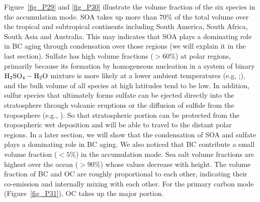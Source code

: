 \documentclass[12pt, fullpage]{uiucthesis2009}
\begin{document}
	Figure~\ref{fig_P29} and \ref{fig_P30} illustrate the volume fraction of the six species in the accumulation mode. SOA takes up more than $70\%$ of the total volume over the tropical and subtropical continents including South America, South Africa, South Asia and Australia. This may indicates that SOA plays a dominating role in BC aging through condensation over those regions (we will explain it in the last section). Sulfate has high volume fractions ($> 60\%$) at polar regions, primarily because its formation by homogeneous nucleation in a system of binary $\rm H_{2}SO_{4}-H_{2}O$ mixture is more likely at a lower ambient temperatures (e.g, \cite{hamill1977nchs};\cite{yue1982temperature}), and the bulk volume of all species at high latitudes tend to be low. In addition, sulfur species that ultimately forms sulfate can be ejected directly into the stratosphere through volcanic eruptions or the diffusion of sulfide from the troposphere (e.g., \cite{castleman1974isotopic}). So that stratospheric portion can be protected from the tropospheric wet deposition and will be able to travel to the distant polar regions. In a later section, we will show that the condensation of SOA and sulfate plays a dominating role in BC aging. We also noticed that BC contribute a small volume fraction ($< 5\%$) in the accumulation mode. Sea salt volume fractions are highest over the ocean ($> 90\%$) whose values decrease with height. The volume fraction of BC and OC are roughly proportional to each other, indicating their co-emission and internally mixing with each other. For the primary carbon mode (Figure~\ref{fig_P31}), OC takes up the major portion.
	
\end{document}
